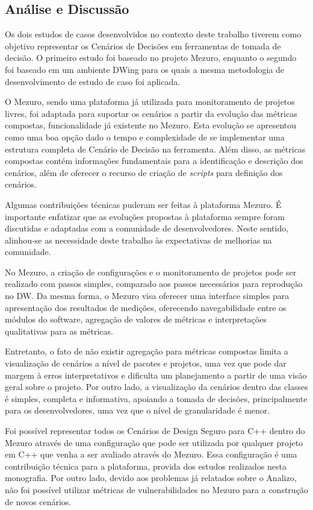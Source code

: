 \subsection{Análise e Discussão}
\label{ana-disc}

Os dois estudos de casos desenvolvidos no contexto deste trabalho tiverem como objetivo representar os Cenários de Decisões em ferramentas de tomada de decisão. O primeiro estudo foi baseado no projeto Mezuro, enquanto o segundo foi baseado em um ambiente DWing para os quais a mesma metodologia de desenvolvimento de estudo de caso foi aplicada. 

O Mezuro, sendo uma plataforma já utilizada para monitoramento de projetos livres, foi adaptada para suportar os cenários a partir da evolução das métricas compostas, funcionalidade já existente no Mezuro. Esta evolução se apresentou como uma boa opção dado o tempo e complexidade de se implementar uma estrutura completa de Cenário de Decisão na ferramenta. Além disso, as métricas compostas contém informações fundamentais para a identificação e descrição dos cenários, além de oferecer o recurso de criação de \emph{scripts} para definição dos cenários.

Algumas contribuições técnicas puderam ser feitas à plataforma Mezuro. É importante enfatizar que as evoluções propostas à plataforma sempre foram discutidas e adaptadas com a comunidade de desenvolvedores. Neste sentido, alinhou-se as necessidade deste trabalho às expectativas de melhorias na comunidade.

No Mezuro, a criação de configurações e o monitoramento de projetos pode ser realizado com passos simples, comparado aos passos necessários para reprodução no DW. Da mesma forma, o Mezuro visa oferecer uma interface simples para apresentação dos resultados de medições, oferecendo navegabilidade entre os módulos do software, agregação de valores de métricas e interpretações qualitativas para as métricas.

Entretanto, o fato de não existir agregação para métricas compostas limita a visualização de cenários a nível de pacotes e projetos, uma vez que pode dar margem à erros interpretativos e dificulta um planejamento a partir de uma visão geral sobre o projeto. Por outro lado, a visualização da cenários dentro das classes é simples, completa e informativa, apoiando a tomada de decisões, principalmente para os desenvolvedores, uma vez que o nível de granularidade é menor.

Foi possível representar todos os Cenários de Design Seguro para C++ dentro do Mezuro através de uma configuração que pode ser utilizada por qualquer projeto em C++ que venha a ser avaliado através do Mezuro. Essa configuração é uma contribuição técnica para a plataforma, provida dos estudos realizados nesta monografia. Por outro lado, devido aos problemas já relatados sobre o Analizo, não foi possível utilizar métricas de vulnerabilidades no Mezuro para a construção de novos cenários.

